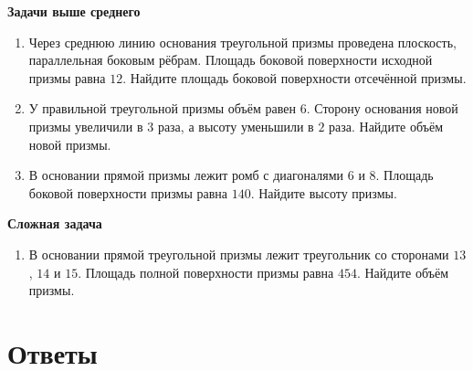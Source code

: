 \documentclass[a4paper,12pt]{article}
\begin{document}
\textbf{Задачи выше среднего}

\begin{enumerate}[label=\arabic*.,resume]
    \item Через среднюю линию основания треугольной призмы проведена плоскость, параллельная боковым рёбрам. Площадь боковой поверхности исходной призмы равна $12$. Найдите площадь боковой поверхности отсечённой призмы.
    
    \item У правильной треугольной призмы объём равен $6$. Сторону основания новой призмы увеличили в $3$ раза, а высоту уменьшили в $2$ раза. Найдите объём новой призмы.
    
    \item В основании прямой призмы лежит ромб с диагоналями $6$ и $8$. Площадь боковой поверхности призмы равна $140$. Найдите высоту призмы.
\end{enumerate}

\textbf{Сложная задача}

\begin{enumerate}[label=\arabic*.,resume]
    \item В основании прямой треугольной призмы лежит треугольник со сторонами $13$, $14$ и $15$. Площадь полной поверхности призмы равна $454$. Найдите объём призмы.
\end{enumerate}

\newpage

\section*{Ответы}

\renewcommand{\arraystretch}{1.35}
\end{document}
